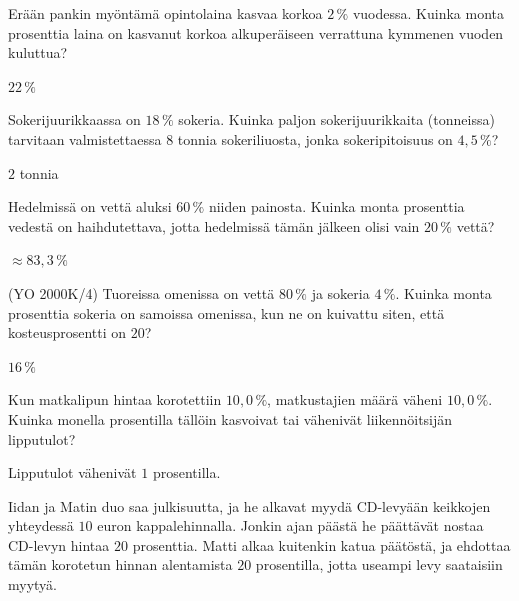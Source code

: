 \begin{tehtavasivu}
\begin{tehtava}
    Erään pankin myöntämä opintolaina kasvaa korkoa $2\,\%$ vuodessa. Kuinka monta prosenttia laina on kasvanut korkoa alkuperäiseen verrattuna kymmenen vuoden kuluttua?
    \begin{vastaus}
        $22\,\%$
    \end{vastaus}
\end{tehtava}

\begin{tehtava}
    Sokerijuurikkaassa on $18\,\%$ sokeria. Kuinka paljon sokerijuurikkaita (tonneissa) tarvitaan valmistettaessa $8$ tonnia sokeriliuosta, jonka sokeripitoisuus on $4,5\,\%$?
    \begin{vastaus}
        $2$ tonnia
    \end{vastaus}
\end{tehtava}

\begin{tehtava} %
    Hedelmissä on vettä aluksi $60\,\%$ niiden painosta. Kuinka monta prosenttia vedestä on haihdutettava, jotta hedelmissä tämän jälkeen olisi vain $20\,\%$ vettä?
    \begin{vastaus}
        $\approx83,3\,\%$ %
    \end{vastaus}
\end{tehtava}

\begin{tehtava}
    (YO 2000K/4) Tuoreissa omenissa on vettä $80\,\%$ ja sokeria $4\,\%$. Kuinka monta prosenttia sokeria on samoissa omenissa, kun ne on kuivattu siten, että kosteusprosentti on $20$?
    \begin{vastaus}
        $16\,\%$
    \end{vastaus}
\end{tehtava}

\begin{tehtava}
    Kun matkalipun hintaa korotettiin $10,0\,\%$, matkustajien määrä väheni $10,0\,\%$. Kuinka monella prosentilla tällöin kasvoivat tai vähenivät liikennöitsijän lipputulot?
    \begin{vastaus}
        Lipputulot vähenivät $1$ prosentilla.
    \end{vastaus}
\end{tehtava}

\begin{tehtava}
    Iidan ja Matin duo saa julkisuutta, ja he alkavat myydä CD-levyään keikkojen yhteydessä $10$ euron kappalehinnalla. Jonkin ajan päästä he päättävät nostaa CD-levyn hintaa $20$ prosenttia. Matti alkaa kuitenkin katua päätöstä, ja ehdottaa tämän korotetun hinnan alentamista $20$ prosentilla, jotta useampi levy saataisiin myytyä.
    \begin{vastaus}
    \end{vastaus}
\end{tehtava}


\end{tehtavasivu}
